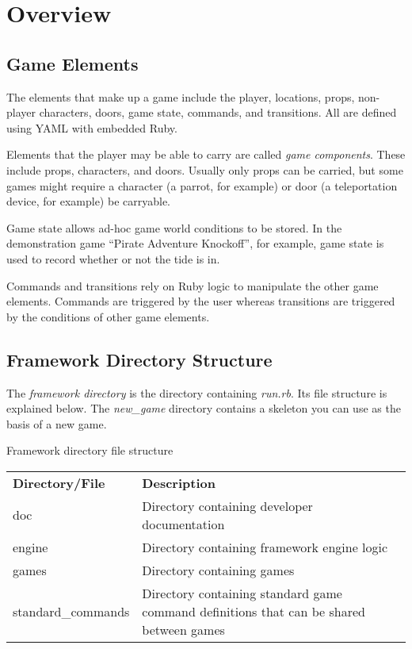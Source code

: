 \documentclass[letterpaper,10pt,english]{sphinxmanual}
\begin{document}
\chapter{Overview}
\label{overview:overview}\label{overview::doc}

\section{Game Elements}
\label{overview:game-elements}
The elements that make up a game include the player, locations, props, non-player characters, doors, game state, commands, and transitions. All are defined using YAML with embedded Ruby.

Elements that the player may be able to carry are called \emph{game components}. These include props, characters, and doors. Usually only props can be carried, but some games might require a character (a parrot, for example) or door (a teleportation device, for example) be carryable.

Game state allows ad-hoc game world conditions to be stored. In the demonstration game ``Pirate Adventure Knockoff'', for example, game state is used to record whether or not the tide is in.

Commands and transitions rely on Ruby logic to manipulate the other game elements. Commands are triggered by the user whereas transitions are triggered by the conditions of other game elements.


\section{Framework Directory Structure}
\label{overview:framework-directory-structure}
The \emph{framework directory} is the directory containing \emph{run.rb}. Its file structure is explained below. The \emph{new\_game} directory contains a skeleton you can use as the basis of a new game.

\begin{threeparttable}
\capstart\caption{Framework directory file structure}

\begin{tabulary}{\linewidth}{|L|L|}
\hline

\textbf{Directory/File}
 & 
\textbf{Description}
\\

doc
 & 
Directory containing developer documentation
\\

engine
 & 
Directory containing framework engine logic
\\

games
 & 
Directory containing games
\\

standard\_commands
 & 
Directory containing standard game command definitions that can be shared between games
\\
\hline
\end{tabulary}

\end{threeparttable}
\end{document}
